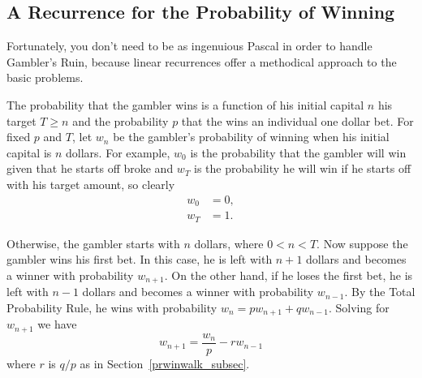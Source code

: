 \subsection{A Recurrence for the Probability of Winning}

Fortunately, you don't need to be as ingenuious Pascal in order to
handle Gambler's Ruin, because linear recurrences offer a methodical
approach to the basic problems.

The probability that the gambler wins is a function of his initial
capital $n$ his target $T \geq n$ and the probability $p$ that
the wins an individual one dollar bet.  For fixed $p$ and $T$, let
$w_n$ be the gambler's probability of winning when his initial
capital is $n$ dollars.  For example, $w_0$ is the probability that
the gambler will win given that he starts off broke and $w_T$ is the
probability he will win if he starts off with his target amount, so
clearly
\begin{align}
w_0 & = 0,\label{LN12:w0}\\
w_T & = 1. \label{LN12:wT}
\end{align}

Otherwise, the gambler starts with $n$ dollars, where $0 < n < T$.
Now suppose the gambler wins his first bet.  In this case, he is left
with $n+1$ dollars and becomes a winner with probability $w_{n+1}$.
On the other hand, if he loses the first bet, he is left with $n-1$
dollars and becomes a winner with probability $w_{n-1}$.  By the Total
Probability Rule, he wins with probability $w_n = p w_{n+1} + q
w_{n-1}$.  Solving for $w_{n+1}$ we have
\begin{equation}\label{LN12:rec1}
w_{n+1} = \frac{w_n}{p} - r w_{n-1}
\end{equation}
where $r$ is $q/p$ as in Section~\ref{prwinwalk_subsec}.

